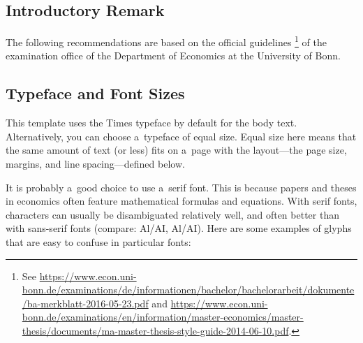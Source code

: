 \begingroup

\let \longtblrOrig \longtblr
\renewcommand{\longtblr}{%
	\fontsize{\fsnormal}{\smalllinespacing}\selectfont%
	\longtblrOrig%
}

\subsection{Introductory Remark}
The following recommendations are based on the official guidelines%
\footnote{See \url{https://www.econ.uni-bonn.de/examinations/de/informationen/bachelor/bachelorarbeit/dokumente/ba-merkblatt-2016-05-23.pdf} and \url{https://www.econ.uni-bonn.de/examinations/en/information/master-economics/master-thesis/documents/ma-master-thesis-style-guide-2014-06-10.pdf}.}
of the examination office of the Department of Economics at the University of Bonn.

\subsection{Typeface and Font Sizes}
This template uses the Times typeface by default for the body text. Alternatively, you can choose a~typeface of equal size. Equal size here means that the same amount of text (or less) fits on a~page with the layout---the page size, margins, and line spacing---defined below.

It is probably a~good choice to use a~serif font. This is because papers and theses in economics often feature mathematical formulas and equations. With serif fonts, characters can usually be disambiguated relatively well, and often better than with sans-serif fonts (compare: Al/AI, {\selectfont Al/AI}). Here are some examples of glyphs that are easy to confuse in particular fonts:

